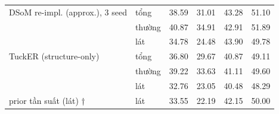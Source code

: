 \begin{table}[t]
\begin{tabular}{l l r r r r}
\midrule
DSoM re-impl. (approx.), 3 seed & tổng & 38.59 & 31.01 & 43.28 & 51.10 \\
 & thường & 40.87 & 34.91 & 42.91 & 51.89 \\
 & lát & 34.78 & 24.48 & 43.90 & 49.78 \\
\midrule
TuckER (structure-only) & tổng & 36.80 & 29.67 & 40.87 & 49.11 \\
 & thường & 39.22 & 33.63 & 41.11 & 49.60 \\
 & lát & 32.76 & 23.05 & 40.48 & 48.29 \\
\midrule
prior tần suất (lát) † & lát & 33.55 & 22.19 & 42.15 & 50.00 \\
\bottomrule
\end{tabular}
\end{table}
